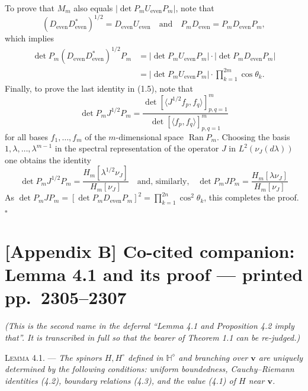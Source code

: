 \documentclass[11pt]{article}
\newcommand{\Dev}{D_{\mathrm{even}}}
\newcommand{\Uev}{U_{\mathrm{even}}}
\newcommand{\bHd}{\mathbb{H}^{\diamond}}
\newcommand{\bvv}{\mathbf{v}}
\begin{document}
To prove that $M_m$ also equals $|\det P_m\Uev P_m|$, note that
\[
(\Dev D_{\mathrm{even}}^{*})^{1/2} = \Dev\Uev
\quad\text{and}\quad P_m\Dev = P_m\Dev P_m,
\]
which implies
\begin{align*}
\det P_m(\Dev D_{\mathrm{even}}^{*})^{1/2}P_m
&= |\det P_m\Uev P_m|\cdot|\det P_m\Dev P_m|\\
&= |\det P_m\Uev P_m|\cdot\prod_{k=1}^{2m}\cos\theta_k.
\end{align*}
Finally, to prove the last identity in (1.5), note that
\[
\det P_mJ^{1/2}P_m
= \frac{\det[\langle J^{1/2}f_p,f_q\rangle]_{p,q=1}^{m}}
{\det[\langle f_p,f_q\rangle]_{p,q=1}^{m}}
\]
for all bases $f_1,\dots,f_m$ of the $m$-dimensional space
$\operatorname{Ran}P_m$. Choosing the basis $1,\lambda,\dots,\lambda^{m-1}$ in
the spectral representation of the operator $J$ in $L^2(\nu_J(d\lambda))$ one
obtains the identity
\[
\det P_mJ^{1/2}P_m = \frac{H_m[\lambda^{1/2}\nu_J]}{H_m[\nu_J]}
\quad\text{and, similarly,}\quad
\det P_mJP_m = \frac{H_m[\lambda\nu_J]}{H_m[\nu_J]}
\]
As $\det P_mJP_m = [\det P_m\Dev P_m]^2
= \prod_{k=1}^{2n}\cos^2\theta_k$, this completes the proof.
\hfill$\square$

\section*{[Appendix B] Co-cited companion: Lemma 4.1 and its proof --- printed pp.~2305--2307}

\noindent\emph{(This is the second name in the deferral ``Lemma 4.1 and
Proposition 4.2 imply that''. It is transcribed in full so that the bearer of
Theorem 1.1 can be re-judged.)}

\medskip
\noindent\textsc{Lemma 4.1.} --- \emph{The spinors $H,H^{\circ}$ defined in
$\bHd$ and branching over $\bvv$ are uniquely determined by the following
conditions: uniform boundedness, Cauchy--Riemann identities (4.2), boundary
relations (4.3), and the value (4.1) of $H$ near $\bvv$.}
\end{document}
